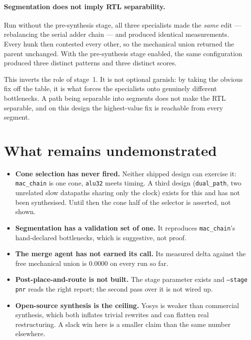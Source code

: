 \documentclass[11pt,a4paper]{article}
\begin{document}
\paragraph{Segmentation does not imply RTL separability.}
Run without the pre-synthesis stage, all three specialists made the
\emph{same} edit --- rebalancing the serial adder chain --- and produced
identical measurements. Every hunk then contested every other, so the
mechanical union returned the parent unchanged. With the pre-synthesis stage
enabled, the same configuration produced three distinct patterns and three
distinct scores.

This inverts the role of stage~1. It is not optional garnish: by taking the
obvious fix off the table, it is what forces the specialists onto genuinely
different bottlenecks. A path being separable into segments does not make the
RTL separable, and on this design the highest-value fix is reachable from every
segment.

\section{What remains undemonstrated}

\begin{itemize}\itemsep2pt
\item \textbf{Cone selection has never fired.} Neither shipped design can
      exercise it: \texttt{mac\_chain} is one cone, \texttt{alu32} meets
      timing. A third design (\texttt{dual\_path}, two unrelated slow
      datapaths sharing only the clock) exists for this and has not been
      synthesised. Until then the cone half of the selector is asserted, not
      shown.
\item \textbf{Segmentation has a validation set of one.} It reproduces
      \texttt{mac\_chain}'s hand-declared bottlenecks, which is suggestive,
      not proof.
\item \textbf{The merge agent has not earned its call.} Its measured delta
      against the free mechanical union is $0.0000$ on every run so far.
\item \textbf{Post-place-and-route is not built.} The stage parameter exists
      and \texttt{--stage pnr} reads the right report; the second pass over it
      is not wired up.
\item \textbf{Open-source synthesis is the ceiling.} Yosys is weaker than
      commercial synthesis, which both inflates trivial rewrites and can
      flatten real restructuring. A slack win here is a smaller claim than the
      same number elsewhere.
\end{itemize}
\end{document}
